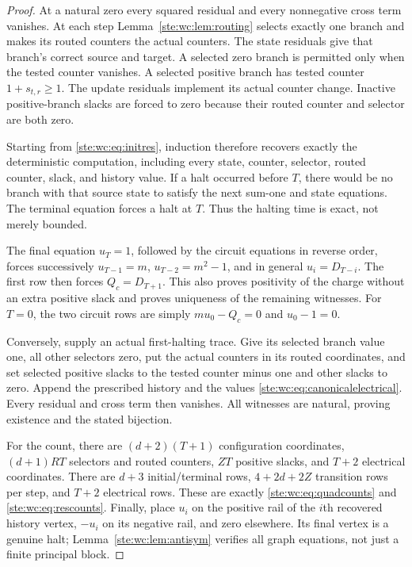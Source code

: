 \documentclass[11pt,letterpaper]{article}
\theoremstyle{definition}
\theoremstyle{remark}
\begin{document}
\begin{proof}
At a natural zero every squared residual and every nonnegative cross term
vanishes. At each step Lemma~\ref{ste:wc:lem:routing} selects exactly one branch and
makes its routed counters the actual counters. The state residuals give
that branch's correct source and target. A selected zero branch is
permitted only when the tested counter vanishes. A selected positive
branch has tested counter $1+s_{t,r}\geq1$. The update residuals implement
its actual counter change. Inactive positive-branch slacks are forced to
zero because their routed counter and selector are both zero.

Starting from \eqref{ste:wc:eq:initres}, induction therefore recovers exactly the
deterministic computation, including every state, counter, selector,
routed counter, slack, and history value. If a halt occurred before $T$,
there would be no branch with that source state to satisfy the next
sum-one and state equations. The terminal equation forces a halt at $T$.
Thus the halting time is exact, not merely bounded.

The final equation $u_T=1$, followed by the circuit equations in reverse
order, forces successively $u_{T-1}=m$, $u_{T-2}=m^2-1$, and in general
$u_i=D_{T-i}$. The first row then forces $Q_c=D_{T+1}$. This also proves
positivity of the charge without an extra positive slack and proves
uniqueness of the remaining witnesses. For $T=0$, the two circuit rows
are simply $mu_0-Q_c=0$ and $u_0-1=0$.

Conversely, supply an actual first-halting trace. Give its selected branch
value one, all other selectors zero, put the actual counters in its routed
coordinates, and set selected positive slacks to the tested counter minus
one and other slacks to zero. Append the prescribed history and the values
\eqref{ste:wc:eq:canonicalelectrical}. Every residual and cross term then
vanishes. All witnesses are natural, proving existence and the stated
bijection.

For the count, there are $(d+2)(T+1)$ configuration coordinates,
$(d+1)RT$ selectors and routed counters, $ZT$ positive slacks, and $T+2$
electrical coordinates. There are $d+3$ initial/terminal rows,
$4+2d+2Z$ transition rows per step, and $T+2$ electrical rows. These are
exactly \eqref{ste:wc:eq:quadcounts} and \eqref{ste:wc:eq:rescounts}.
Finally, place $u_i$ on the positive rail of the $i$th recovered history
vertex, $-u_i$ on its negative rail, and zero elsewhere. Its final vertex
is a genuine halt; Lemma~\ref{ste:wc:lem:antisym} verifies all graph equations, not
just a finite principal block.
\end{proof}
\end{document}
